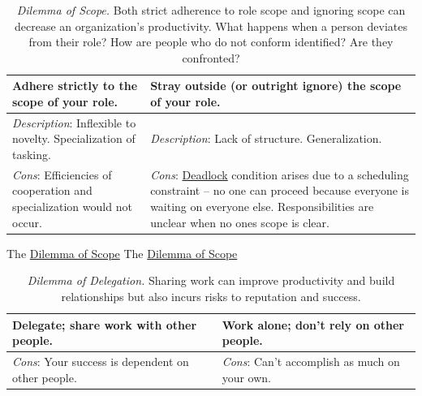 \begin{center}
\begin{table}[H] %
\begin{tabular}{ | m{\dilemmatablewidth}| m{\dilemmatablewidth} | }
  \hline
  \textbf{Adhere strictly to the scope of your role.} & 
  \textbf{Stray outside (or outright ignore) the scope of your role.} \\ 
  \hline
  \textit{Description}: Inflexible to novelty. Specialization of tasking. & 
  \textit{Description}: Lack of structure. Generalization. \\ 
  \hline
  \textit{Cons}: Efficiencies of cooperation and specialization would not occur. & 
  \textit{Cons}: \href{https://en.wikipedia.org/wiki/Deadlock}{Deadlock} condition arises due to a scheduling constraint -- no one can proceed because everyone is waiting on everyone else. Responsibilities are unclear when no ones scope is clear. \\  
  \hline
\end{tabular}
\caption{
\textit{Dilemma of Scope.}
Both strict adherence to role scope and ignoring scope can decrease an organization's productivity. 
What happens when a person deviates from their role?
How are people who do not conform identified? Are they confronted?
}
\label{table:scope_of_activity}
\end{table}
\end{center}


The \href{table:scope_of_activity}{Dilemma of Scope}
The \href{table:scope_of_activity}{Dilemma of Scope}


\begin{center}
\begin{table}[H] %
\begin{tabular}{ | m{\dilemmatablewidth}| m{\dilemmatablewidth} | } 
  \hline
  \textbf{Delegate; share work with other people.} & 
  \textbf{Work alone; don't rely on other people.} \\ 
  \hline
  \textit{Cons}: Your success is dependent on other people. & 
  \textit{Cons}: Can't accomplish as much on your own. \\  
  \hline
\end{tabular}
\caption{
\textit{Dilemma of Delegation.}
Sharing work can improve productivity and build relationships but also incurs risks to reputation and success.
}
\label{table:delegate-or-not}
\end{table}
\end{center}


